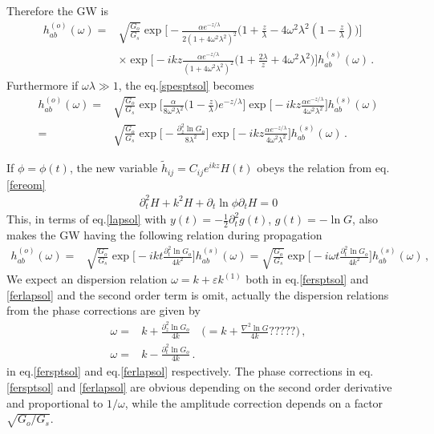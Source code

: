 \documentclass[
 jor,
 amsmath,amssymb,preprint,
]{revtex4-2}
\begin{document}
Therefore the GW is
\begin{equation}
\begin{aligned}
h^{(o)}_{ab}(\omega) = &  \sqrt{\frac{G_o}{G_s}}\exp\bigg[- \frac{\alpha e^{-z/\lambda}}{2(1+4\omega^2\lambda^2)^2} \bigg(1 + \frac{z}{\lambda} -4\omega^2\lambda^2(1 - \frac{z}{\lambda})\bigg)\bigg] \\
& \times \exp\bigg[- i k z\frac{\alpha e^{-z/\lambda}}{(1+4\omega^2\lambda^2)^2} \bigg(1 + \frac{2\lambda}{z} + 4\omega^2\lambda^2\bigg) \bigg] h_{ab}^{(s)}(\omega) \,. \label{spesptsol}
\end{aligned}
\end{equation}
Furthermore if $\omega \lambda \gg 1$, the eq.\eqref{spesptsol} becomes
\begin{equation}
\begin{aligned}
h^{(o)}_{ab}(\omega) = &  \sqrt{\frac{G_o}{G_s}}\exp\bigg[\frac{\alpha}{8\omega^2\lambda^2} \bigg(1 - \frac{z}{\lambda}\bigg)e^{-z/\lambda} \bigg] \exp\bigg[- i k z\frac{\alpha e^{-z/\lambda}}{4\omega^2\lambda^2} \bigg] h_{ab}^{(s)}(\omega) \\
= & \sqrt{\frac{G_o}{G_s}}\exp\bigg[-\frac{\partial_z^2 \ln G_o}{8\lambda^2} \bigg] \exp\bigg[- i k z\frac{\alpha e^{-z/\lambda}}{4\omega^2\lambda^2} \bigg] h_{ab}^{(s)}(\omega) \,.
\end{aligned}
\end{equation}

If $\phi = \phi(t)$, the new variable $\tilde{h}_{ij} = C_{ij}e^{ikz}H(t)$ obeys the relation from eq.\eqref{fereom}
\begin{align}
\partial_t^2 H + k^2H + \partial_t\ln\phi \partial_t H = 0
\end{align}
This, in terms of eq.\eqref{lapsol} with $y(t) = -\frac{1}{2}\partial_t^2g(t)$, $g(t) = -\ln G$, also makes the GW having the following relation during propagation
\begin{equation}
\begin{aligned}
h^{(o)}_{ab}(\omega) = & \sqrt{\frac{G_o}{G_s}} \exp\bigg[-ik t\frac{\partial_t^2 \ln G_o}{4k^2} \bigg] h_{ab}^{(s)}(\omega) = \sqrt{\frac{G_o}{G_s}} \exp\bigg[-i\omega t\frac{\partial_t^2 \ln G_o}{4k^2} \bigg] h_{ab}^{(s)}(\omega)\,, \label{ferlapsol}
\end{aligned}
\end{equation}
We expect an dispersion relation $\omega = k + \varepsilon k^{(1)}$ both in eq.\eqref{fersptsol} and \eqref{ferlapsol} and the second order term is omit, actually the dispersion relations from the phase corrections are given by
\begin{align}
\omega = & k + \frac{\partial_z^2\ln G_o}{4k} \quad \bigg( = k + \frac{\nabla^2\ln G}{4k} ????? \bigg)\,, \\
\omega = & k - \frac{\partial_t^2\ln G_o}{4k}\,.
\end{align}
in eq.\eqref{fersptsol} and eq.\eqref{ferlapsol} respectively. The phase corrections in eq.\eqref{fersptsol} and \eqref{ferlapsol} are obvious depending on the second order derivative and proportional to $1/\omega$, while the amplitude correction depends on a factor $\sqrt{G_o/G_s}$.
\end{document}
